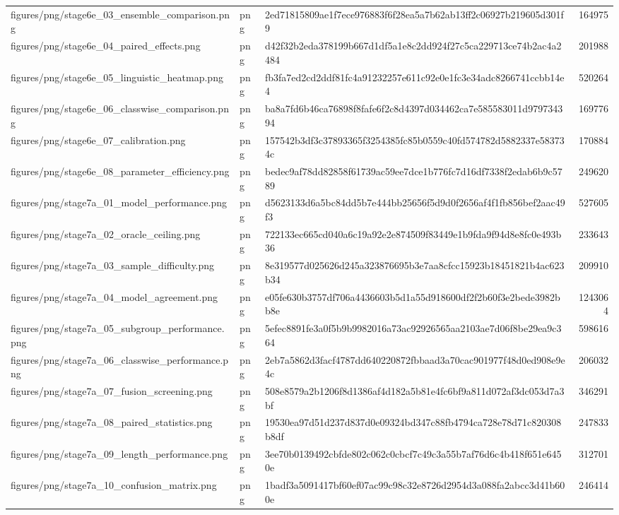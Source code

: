 \begin{tabular}{lllr}
figures/png/stage6e_03_ensemble_comparison.png & png & 2ed71815809ae1f7ece976883f6f28ea5a7b62ab13ff2c06927b219605d301f9 & 164975 \\
figures/png/stage6e_04_paired_effects.png & png & d42f32b2eda378199b667d1df5a1e8c2dd924f27c5ca229713ce74b2ac4a2484 & 201988 \\
figures/png/stage6e_05_linguistic_heatmap.png & png & fb3fa7ed2cd2ddf81fc4a91232257e611c92e0e1fc3e34adc8266741ccbb14e4 & 520264 \\
figures/png/stage6e_06_classwise_comparison.png & png & ba8a7fd6b46ca76898f8fafe6f2c8d4397d034462ca7e585583011d979734394 & 169776 \\
figures/png/stage6e_07_calibration.png & png & 157542b3df3c37893365f3254385fc85b0559c40fd574782d5882337e583734c & 170884 \\
figures/png/stage6e_08_parameter_efficiency.png & png & bedec9af78dd82858f61739ac59ee7dce1b776fc7d16df7338f2edab6b9c5789 & 249620 \\
figures/png/stage7a_01_model_performance.png & png & d5623133d6a5bc84dd5b7e444bb25656f5d9d0f2656af4f1fb856bef2aac49f3 & 527605 \\
figures/png/stage7a_02_oracle_ceiling.png & png & 722133ec665cd040a6c19a92e2e874509f83449e1b9fda9f94d8e8fc0e493b36 & 233643 \\
figures/png/stage7a_03_sample_difficulty.png & png & 8e319577d025626d245a323876695b3e7aa8cfcc15923b18451821b4ac623b34 & 209910 \\
figures/png/stage7a_04_model_agreement.png & png & e05fe630b3757df706a4436603b5d1a55d918600df2f2b60f3e2bede3982bb8e & 1243064 \\
figures/png/stage7a_05_subgroup_performance.png & png & 5efec8891fe3a0f5b9b9982016a73ac92926565aa2103ae7d06f8be29ea9c364 & 598616 \\
figures/png/stage7a_06_classwise_performance.png & png & 2eb7a5862d3facf4787dd640220872fbbaad3a70cac901977f48d0ed908e9e4c & 206032 \\
figures/png/stage7a_07_fusion_screening.png & png & 508e8579a2b1206f8d1386af4d182a5b81e4fc6bf9a811d072af3dc053d7a3bf & 346291 \\
figures/png/stage7a_08_paired_statistics.png & png & 19530ea97d51d237d837d0e09324bd347c88fb4794ca728e78d71c820308b8df & 247833 \\
figures/png/stage7a_09_length_performance.png & png & 3ee70b0139492cbfde802c062c0cbcf7c49c3a55b7af76d6c4b418f651e6450e & 312701 \\
figures/png/stage7a_10_confusion_matrix.png & png & 1badf3a5091417bf60ef07ac99c98c32e8726d2954d3a088fa2abcc3d41b600e & 246414 \\

\end{tabular}
